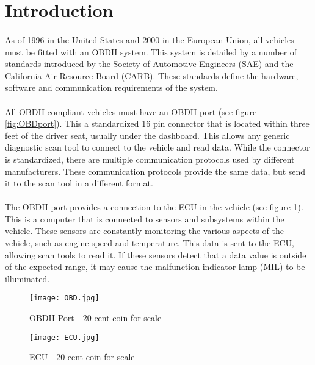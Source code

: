 \section{Introduction}
	\paragraph{}{
	As of 1996 in the United States and 2000 in the European Union, all vehicles must be fitted with an OBDII system. This system is detailed by a number of standards introduced by the Society of Automotive Engineers (SAE) and the California Air Resource Board (CARB). These standards define the hardware, software and communication requirements of the system.
	}
	\paragraph{}{
	All OBDII compliant vehicles must have an OBDII port (see figure \ref{fig:OBDport}). This a standardized 16 pin connector that is located within three feet of the driver seat, usually under the dashboard. This allows any generic diagnostic scan tool to connect to the vehicle and read data. While the connector is standardized, there are multiple communication protocols used by different manufacturers. These communication protocols provide the same data, but send it to the scan tool in a different format.
	}
	\paragraph{}{
	The OBDII port provides a connection to the ECU in the vehicle (see figure \ref{fig:ECU}). This is a computer that is connected to sensors and subsystems within the vehicle. These sensors are constantly monitoring the various aspects of the vehicle, such as engine speed and temperature. This data is sent to the ECU, allowing scan tools to read it. If these sensors detect that a data value is outside of the expected range, it may cause the malfunction indicator lamp (MIL) to be illuminated.
	}
	\begin{figure}[h]
		\begin{center}								
			\begin{minipage}{0.45\textwidth}
				\texttt{[image: OBD.jpg]}
				\caption{OBDII Port - 20 cent coin for scale}						
				\label{fig:OBDport}
			\end{minipage}
			\hfill			
			\begin{minipage}{0.45\textwidth}
				\texttt{[image: ECU.jpg]}
				\caption{ECU - 20 cent coin for scale}
				\label{fig:ECU}
			\end{minipage}									
		\end{center}
	\end{figure}	
\newpage
